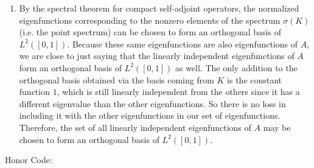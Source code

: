 \documentclass[11pt]{article}
\begin{document}
\begin{enumerate}[label=\textbf{\arabic*.}]
\begin{enumerate}[label=\textsf{(\roman*)}]
        \item By the spectral theorem for compact self-adjoint operators, the normalized eigenfunctions corresponding to the nonzero elements of the spectrum $\sigma(K)$ (i.e. the point spectrum) can be chosen to form an orthogonal basis of $L^2([0,1])$. Because these same eigenfunctions are also eigenfunctions of $A$, we are close to just saying that the linearly independent eigenfunctions of $A$ form an orthogonal basis of $L^2([0,1])$ as well. The only addition to the orthogonal basis obtained via the basis coming from $K$ is the constant function $1$, which is still linearly independent from the others since it has a different eigenvalue than the other eigenfunctions. So there is no loss in including it with the other eigenfunctions in our set of eigenfunctions. Therefore, the set of all linearly independent eigenfunctions of $A$ may be chosen to form an orthogonal basis of $L^2([0,1])$.
    \end{enumerate}
    \hrulefill
\end{enumerate}
Honor Code: \vspace*{7em}
\end{document}
